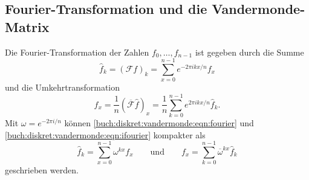 %
%
\subsection{Fourier-Transformation und die Vandermonde-Matrix
\label{buch:diskret:subsection:fourier}}
Die Fourier-Transformation der Zahlen $f_0,\dots,f_{n-1}$ ist
gegeben durch die Summe
\begin{equation}
\hat{f}_k
=
(\mathscr{F}f)_k
=
\sum_{x=0}^{n-1} e^{-2\pi i kx/n} f_x
\label{buch:diskret:vandermonde:eqn:fourier}
\end{equation}
und die Umkehrtransformation
\begin{equation}
f_x
=
\frac{1}{n}
(\overline{\mathscr{F}}\hat{f})_x
=
\frac{1}{n}
\sum_{k=0}^{n-1} e^{2\pi i kx/n} \hat{f}_k.
\label{buch:diskret:vandermonde:eqn:ifourier}
\end{equation}
Mit $\omega= e^{-2\pi i/n}$ können
\eqref{buch:diskret:vandermonde:eqn:fourier}
und
\eqref{buch:diskret:vandermonde:eqn:ifourier}
kompakter als
\[
\hat{f}_k
=
\sum_{x=0}^{n-1} \omega^{kx}f_x
\qquad\text{und}\qquad
f_x
=
\sum_{k=0}^{n-1} \overline{\omega}^{kx}\hat{f}_k
\]
geschrieben werden.


